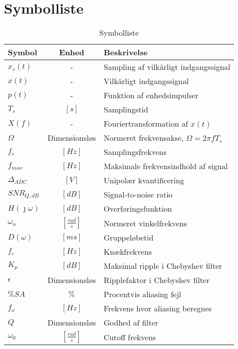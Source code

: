 \chapter{Symbolliste} \label{bilag:symbolliste}
\begin{table}[ht!]
	\caption{Symbolliste}
	\label{tab:symbolliste}
	\begin{threeparttable}
		\begin{tabular}{l c p{}}
			\toprule
			\textbf{Symbol}      &
			\textbf{Enhed} & \textbf{Beskrivelse} \\
			\midrule
			$x_s(t)$ &	- & Sampling af vilkårligt indgangssignal \\
			$x(t)$   & 	- &  Vilkårligt indgangssignal \\
			$p(t)$	 & - & 	Funktion af enhedsimpulser \\
			$T_s$ 	 & $\left[\si{s}\right]$ & Samplingstid \\ 
			$X(f)$ &  -	 &	Fouriertransformation af $x(t)$ \\
			$\Omega$ & Dimensionsløs & Normeret frekvensakse, $\Omega = 2 \pi f T_s$ \\
			$f_s$ &	$\left[\si{Hz}\right]$ & Samplingsfrekvens \\
			$f_{max}$ & $\left[\si{Hz}\right]$ & Maksimale frekvensindhold af signal \\
			$\Delta_{ADC}$ & $[\si{V}]$ & Unipolær kvantificering \\
			$SNR_{Q, dB}$ & $[\si{dB}]$ & Signal-to-noise ratio \\
			$H(\jmath \omega)$ & $\left[\si{dB}\right]$ & Overføringsfunktion\\
			$\omega_n$ & $\left[\si{\frac{rad}{s}}\right]$ &  Normeret vinkelfrekvens \\
			$D(\omega)$ & $\left[\si{ms}\right]$ &  Gruppeløbetid \\
			$f_c$ & $\left[\si{Hz}\right]$ & Knækfrekvens \\
			$K_p$ & $\left[\si{dB}\right]$ & Maksimal ripple i Chebyshev filter \\
			$\epsilon$ & Dimensionsløs & Ripplefaktor i Chebyshev filter \\
			$\%SA$ & $\%$ & Procentvis aliasing fejl\\
			$f_x$ & $\left[\si{Hz}\right]$ & Frekvens hvor aliasing beregnes\\
			$Q$ & Dimensionsløs & Godhed af filter \\
			$\omega_0$ & $\left[\si{\frac{rad}{s}}\right]$ & Cutoff frekvens\\

\end{tabular}
\end{threeparttable}
\end{table}
